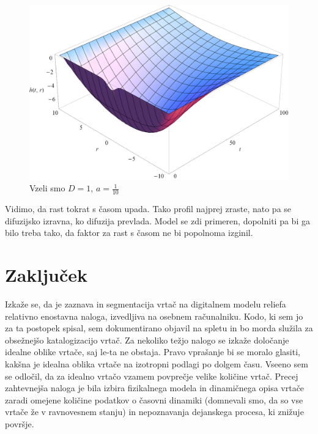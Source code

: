 \documentclass[a4paper, oneside, 12pt]{book}
\begin{document}
            \begin{figure}[H]
              \begin{center}
                \includegraphics[width=14cm]{slike/difuzija-gompertzova-rast2}
              \end{center}
              \caption{Vzeli smo $D=1$, $a=\frac{1}{10}$}
              \label{fig:difuzija-gompertzova-rast}
            \end{figure}

            Vidimo, da rast tokrat s časom upada. Tako profil najprej zraste, nato pa se difuzijsko izravna, ko difuzija prevlada.
            Model se zdi primeren, dopolniti pa bi ga bilo treba tako, da faktor za rast s časom ne bi popolnoma izginil.

\newpage

            \chapter{Zaključek}

            Izkaže se, da je zaznava in segmentacija vrtač na digitalnem modelu reliefa relativno enostavna naloga, izvedljiva na osebnem računalniku. Kodo, ki sem jo za ta postopek spisal, sem dokumentirano objavil na spletu in bo morda služila za obsežnejšo katalogizacijo vrtač.
Za nekoliko težjo nalogo se izkaže določanje idealne oblike vrtače, saj le-ta ne obstaja. Pravo vprašanje bi se moralo glasiti, kakšna je idealna oblika vrtače na izotropni podlagi po dolgem času. Vseeno sem se odločil, da za idealno vrtačo vzamem povprečje velike količine vrtač.
Precej zahtevnejša naloga je bila izbira fizikalnega modela in dinamičnega opisa vrtače zaradi omejene količine podatkov o časovni dinamiki (domnevali smo, da so vse vrtače že v ravnovesnem stanju) in nepoznavanja dejanskega procesa, ki znižuje površje.
\end{document}
